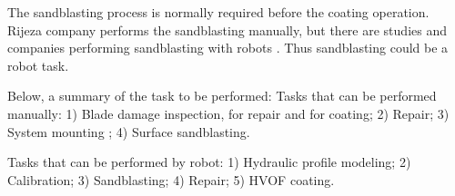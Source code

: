 The sandblasting process is normally required before the coating
operation. %
Rijeza company performs the sandblasting manually, but there are studies and
companies performing sandblasting with robots \citep{ren2008path}. Thus
sandblasting could be a robot task.


Below, a summary of the task to be performed:
Tasks that can be performed manually: 1) Blade damage inspection, for repair and
for coating; 2) Repair; 3) System mounting ; 4) Surface sandblasting.

Tasks that can be performed by robot: 1) Hydraulic profile modeling; 2)
Calibration; 3) Sandblasting; 4) Repair; 5) HVOF coating.
